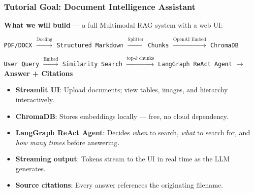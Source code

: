 \begin{frame}[fragile]\frametitle{Tutorial Goal: Document Intelligence Assistant}

\textbf{What we will build} --- a full Multimodal RAG system with a web UI:

\vspace{0.3em}
\begin{center}
\small
\texttt{PDF/DOCX} $\xrightarrow{\text{Docling}}$ \texttt{Structured Markdown} $\xrightarrow{\text{Splitter}}$ \texttt{Chunks} $\xrightarrow{\text{OpenAI Embed}}$ \texttt{ChromaDB}

\vspace{0.5em}
\texttt{User Query} $\xrightarrow{\text{Embed}}$ \texttt{Similarity Search} $\xrightarrow{\text{top-}k\text{ chunks}}$ \texttt{LangGraph ReAct Agent} $\rightarrow$ \textbf{Answer + Citations}
\end{center}

\vspace{0.3em}
      \begin{itemize}
        \item \textbf{Streamlit UI}: Upload documents; view tables, images, and hierarchy interactively.
        \item \textbf{ChromaDB}: Stores embeddings locally --- free, no cloud dependency.
        \item \textbf{LangGraph ReAct Agent}: Decides \textit{when} to search, \textit{what} to search for, and \textit{how many times} before answering.
        \item \textbf{Streaming output}: Tokens stream to the UI in real time as the LLM generates.
        \item \textbf{Source citations}: Every answer references the originating filename.
      \end{itemize}
\end{frame}

